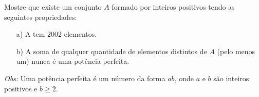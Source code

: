 Mostre que existe um conjunto $A$ formado por inteiros positivos tendo as seguintes propriedades:
\begin{itemize}
\item[a)] A tem $2002$ elementos.
\item[b)] A soma de qualquer quantidade de elementos distintos de $A$ (pelo menos um) nunca é uma potência perfeita.
\end{itemize}

\textit{Obs:} Uma potência perfeita é um número da forma $ab$, onde $a$ e $b$ são inteiros positivos e $b \ge 2$.